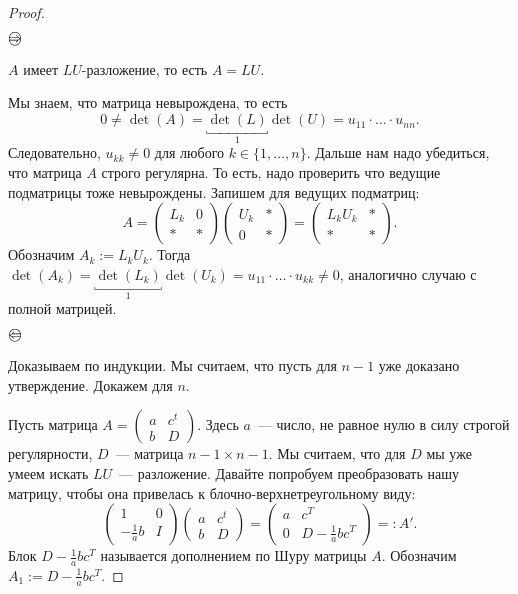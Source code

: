 \begin{proof}~

    $\Orightarrow$ 
    
    $A$ имеет $LU$-разложение, то есть $A = LU$.
    
    Мы знаем, что матрица невырождена, то есть 
    \begin{equation*}
        0 \neq \det(A) = \underbracket{\det(L)}_1 \det(U) = u_{11} \cdot \ldots \cdot u_{nn}.
    \end{equation*}
    Следовательно, $u_{kk} \neq 0$ для любого $k \in \{1, \dots, n\}$. Дальше нам надо убедиться, что матрица $A$ строго регулярна. То есть, надо проверить что ведущие подматрицы тоже невырождены. Запишем для ведущих подматриц:
    \begin{equation*}
        A = \begin{pmatrix}
            L_k & 0 \\
            * & *
        \end{pmatrix} \begin{pmatrix}
            U_k & * \\
            0 & *
        \end{pmatrix} = \begin{pmatrix}
            L_k U_k & * \\
            * & *
        \end{pmatrix}.
    \end{equation*}
    Обозначим $A_k := L_k U_k$. Тогда $\det(A_k) = \underbracket{\det(L_k)}_1 \det(U_k) = u_{11} \cdot \ldots \cdot u_{kk} \neq 0$, аналогично случаю с полной матрицей.

    $\Oleftarrow$
    
    Доказываем по индукции. Мы считаем, что пусть для $n-1$ уже доказано утверждение. Докажем для $n$.

    Пусть матрица $A = \begin{pmatrix}
        a & c^t \\
        b & D
    \end{pmatrix}$. Здесь $a$~--- число, не равное нулю в силу строгой регулярности, $D$~--- матрица $n - 1 \times n - 1$. Мы считаем, что для $D$ мы уже умеем искать $LU$~--- разложение. Давайте попробуем преобразовать нашу матрицу, чтобы она привелась к блочно-верхнетреугольному виду:
    \begin{equation*}
        \begin{pmatrix}
            1 & 0 \\[2pt]
            -\frac{1}{a}b & I
        \end{pmatrix} \begin{pmatrix}
            a & c^t \\
            b & D
        \end{pmatrix} = \begin{pmatrix}
            a & c^T \\
            0 & D - \frac{1}{a}bc^T
        \end{pmatrix} =: A'.
    \end{equation*}
    Блок $D - \frac{1}{a}bc^T$ называется дополнением по Шуру матрицы $A$. Обозначим $A_1 := D - \frac{1}{a}bc^T$. 
    

\end{proof}
